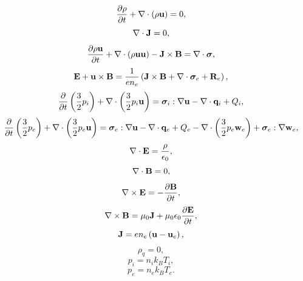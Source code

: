 \documentclass[a4paper,11pt]{report}
\begin{document}
\begin{equation}
    \label{eq:sf_1ion_ni}
    \frac{\partial \rho}{\partial t} + \nabla \cdot \left( \rho \mathbf{u} \right) = 0,
\end{equation}
\begin{equation}
    \label{eq:sf_1ion_ne}
    \nabla \cdot \mathbf{J} = 0,
\end{equation}
\begin{equation}
    \label{eq:sf_1ion_ui}
    \frac{\partial \rho \mathbf{u}}{\partial t} + \nabla \cdot \left( \rho \mathbf{u} \mathbf{u} \right) - \mathbf{J} \times \mathbf{B} = \nabla \cdot \bm \sigma,
\end{equation}
\begin{equation}
    \label{eq:sf_1ion_ue}
    \mathbf{E} + \mathbf{u} \times \mathbf{B} = \frac{1}{e n_e} \left( \mathbf{J} \times \mathbf{B} + \nabla \cdot \bm \sigma_e + \mathbf{R}_e \right),
\end{equation}
\begin{equation}
    \label{eq:sf_1ion_iei}
    \frac{\partial}{\partial t} \left( \frac{3}{2} p_i \right) + \nabla \cdot \left( \frac{3}{2} p_i \mathbf{u} \right) = \bm \sigma_i : \nabla \mathbf{u} - \nabla \cdot \mathbf{q}_i + Q_i,
\end{equation}
\begin{equation}
    \label{eq:sf_1ion_iee}
    \frac{\partial}{\partial t} \left( \frac{3}{2} p_e \right) + \nabla \cdot \left( \frac{3}{2} p_e \mathbf{u} \right) = \bm \sigma_e : \nabla \mathbf{u} - \nabla \cdot \mathbf{q}_e + Q_e - \nabla \cdot \left( \frac{3}{2} p_e \mathbf{w}_e \right) + \bm \sigma_e : \nabla \mathbf{w}_e,
\end{equation}
\begin{equation}
    \label{eq:sf_1ion_maxwell_3}
    \nabla \cdot \mathbf{E} = \frac{\rho}{\epsilon_0},
\end{equation}
\begin{equation}
    \label{eq:sf_1ion_maxwell_4}
    \nabla \cdot \mathbf{B} = 0,
\end{equation}
\begin{equation}
    \label{eq:sf_1ion_maxwell_1}
    \nabla \times \mathbf{E} = -\frac{ \partial \mathbf{B}}{\partial t},
\end{equation}
\begin{equation}
    \label{eq:sf_1ion_maxwell_2}
    \nabla \times \mathbf{B} = \mu_0 \mathbf{J} + \mu_0 \epsilon_0 \frac{\partial \mathbf{E}}{\partial t},
\end{equation}
\begin{equation}
    \label{eq:sf_1ion_curr_density}
    \mathbf{J} = e n_e \left( \mathbf{u} - \mathbf{u}_e \right),
\end{equation}
\begin{equation}
    \label{eq:sf_1ion_mass_density}
    \rho_q = 0,
\end{equation}
\begin{equation}
    \label{eq:sf_1ion_eos_ion}
    p_i = n_i k_B T_i,
\end{equation}
\begin{equation}
    \label{eq:sf_1ion_eos_elec}
    p_e = n_e k_B T_e.
\end{equation}
\end{document}
